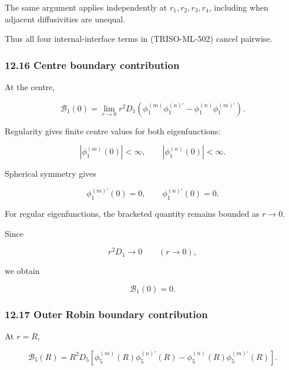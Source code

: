 \documentclass[11pt,a4paper]{article}
\begin{document}
The same argument applies independently at $r_1,r_2,r_3,r_4$, including when adjacent diffusivities are unequal.

Thus all four internal-interface terms in (TRISO-ML-502) cancel pairwise.

\subsubsection*{12.16 Centre boundary contribution}

At the centre,

\begin{equation}
\mathcal B_1(0)
=
\lim_{r\to0}
r^2D_1
\left(
\phi_1^{(m)}\phi_1^{(n)\prime}
-
\phi_1^{(n)}\phi_1^{(m)\prime}
\right).
\tag{TRISO-ML-514}
\label{eq:triso-ml-514}
\end{equation}

Regularity gives finite centre values for both eigenfunctions:

\begin{equation}
|\phi_1^{(m)}(0)|<\infty,
\qquad
|\phi_1^{(n)}(0)|<\infty.
\tag{TRISO-ML-515}
\label{eq:triso-ml-515}
\end{equation}

Spherical symmetry gives

\begin{equation}
\phi_1^{(m)\prime}(0)=0,
\qquad
\phi_1^{(n)\prime}(0)=0.
\tag{TRISO-ML-516}
\label{eq:triso-ml-516}
\end{equation}

For regular eigenfunctions, the bracketed quantity remains bounded as $r\to0$.

Since

\begin{equation}
r^2D_1\to0
\qquad
(r\to0),
\tag{TRISO-ML-517}
\label{eq:triso-ml-517}
\end{equation}

we obtain

\begin{equation}
\boxed{
\mathcal B_1(0)=0.
}
\tag{TRISO-ML-518}
\label{eq:triso-ml-518}
\end{equation}

\subsubsection*{12.17 Outer Robin boundary contribution}

At $r=R$,

\begin{equation}
\mathcal B_5(R)
=
R^2D_5
\left[
\phi_5^{(m)}(R)\phi_5^{(n)\prime}(R)
-
\phi_5^{(n)}(R)\phi_5^{(m)\prime}(R)
\right].
\tag{TRISO-ML-519}
\label{eq:triso-ml-519}
\end{equation}
\end{document}
